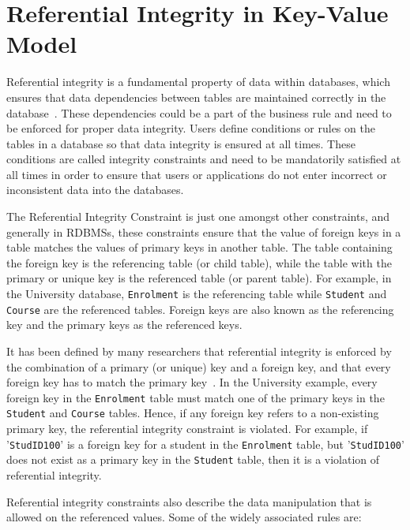 \section{Referential Integrity in Key-Value
Model}\label{s:referential-integrity} 

Referential integrity is a fundamental property of data within databases,  
which ensures that data dependencies between tables are maintained correctly in
the database~\citep{date,blaha,Navathe,george}.  These dependencies
could be a part of the business rule and need to be enforced for proper data integrity.  Users define
conditions or rules on the tables in a database so that data integrity is
ensured at all times.  These conditions are called integrity constraints and
need to be mandatorily satisfied at all times in order to ensure that users or
applications do not enter incorrect or inconsistent data into the databases.

The Referential Integrity Constraint is just one amongst other constraints,  
and generally in \acp{RDBMS},   these constraints ensure that the value of
foreign keys in a table matches the values of primary keys in another table. 
The table containing the foreign key is the referencing table (or child table),
while the table with the primary or unique key is the referenced table (or
parent table).
For example,   in the University database,   \texttt{Enrolment} is the
referencing table while \texttt{Student} and \texttt{Course} are the referenced
tables.  Foreign keys are also known as the referencing key and
the primary keys as the referenced keys. 

It has been defined by many researchers that referential integrity is enforced
by the combination of a primary (or unique) key and a foreign key,   and that
every foreign key has to match the primary
key~\citep{navathe,blaha,george,pathivada}.
In the University example,   every foreign key in the \texttt{Enrolment} table must
match one of the primary keys in the \texttt{Student} and \texttt{Course}
tables.
Hence,   if any foreign key refers to a non-existing primary key,   the
referential integrity constraint is violated.   For example,   if
'\texttt{StudID100}' is a foreign key for a student in the \texttt{Enrolment}
table,   but '\texttt{StudID100}' does not exist as a primary key in the
\texttt{Student} table,   then it is a violation of referential integrity.
 
Referential integrity constraints also describe the data manipulation that is
allowed on the referenced values.  Some of the widely associated rules are:

